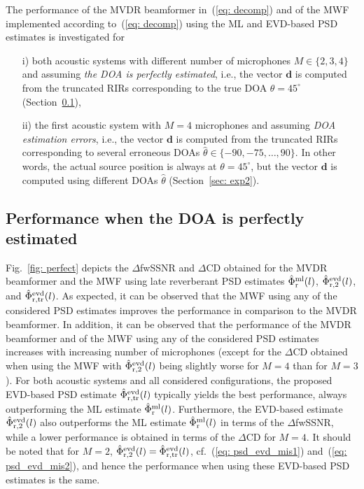 \documentclass{article}
\begin{document}
The performance of the MVDR beamformer in~(\ref{eq: decomp}) and of the MWF implemented according to~(\ref{eq: decomp}) using the ML and EVD-based PSD estimates is investigated for 
\begin{itemize}
\item[i)] both acoustic systems with different number of microphones $M \in \{2, 3, 4 \}$ and assuming {\emph{the DOA is perfectly estimated}}, i.e., the vector $\mathbf{d}$ is computed from the truncated RIRs corresponding to the true DOA $\theta = 45^{\circ}$ (Section~\ref{sec: exp1}), 
\item[ii)] the first acoustic system with $M = 4$ microphones and assuming {\emph{DOA estimation errors}}, i.e., the vector $\mathbf{d}$ is computed from the truncated RIRs corresponding to several erroneous DOAs $\hat{\theta} \in \{-90, -75, \ldots, 90 \}$. 
In other words, the actual source position is always at $\theta = 45^{\circ}$, but the vector $\mathbf{d}$ is computed using different DOAs $\hat{\theta}$ (Section~\ref{sec: exp2}).
\end{itemize}

\subsection{Performance when the DOA is perfectly estimated}
\label{sec: exp1}
Fig.~\ref{fig: perfect} depicts the $\Delta$fwSSNR and $\Delta$CD obtained for the MVDR beamformer and the MWF using late reverberant PSD estimates $\hat{\Phi}^{\rm ml}_{\rm r}(l)$, $\hat{\Phi}^{\rm evd}_{\rm r,2}(l)$, and $\hat{\Phi}^{\rm evd}_{\rm r,tr}(l)$.
As expected, it can be observed that the MWF using any of the considered PSD estimates improves the performance in comparison to the MVDR beamformer.
In addition, it can be observed that the performance of the MVDR beamformer and of the MWF using any of the considered PSD estimates increases with increasing number of microphones (except for the $\Delta$CD obtained when using the MWF with $\hat{\Phi}^{\rm evd}_{\rm r,2}(l)$ being slightly worse for $M = 4$ than for $M = 3$).
For both acoustic systems and all considered configurations, the proposed EVD-based PSD estimate $\hat{\Phi}^{\rm evd}_{\rm r,tr}(l)$ typically yields the best performance, always outperforming the ML estimate $\hat{\Phi}^{\rm ml}_{\rm r}(l)$.
Furthermore, the EVD-based estimate $\hat{\Phi}^{\rm evd}_{\rm r,2}(l)$ also outperforms the ML estimate $\hat{\Phi}^{\rm ml}_{\rm r}(l)$ in terms of the $\Delta$fwSSNR, while a lower performance is obtained in terms of the $\Delta$CD for $M = 4$.
It should be noted that for $M=2$, $\hat{\Phi}^{\rm evd}_{\rm r,2}(l) = \hat{\Phi}^{\rm evd}_{\rm r,tr}(l)$, cf.~(\ref{eq: psd_evd_mis1}) and~(\ref{eq: psd_evd_mis2}), and hence the performance when using these EVD-based PSD estimates is the same.
\end{document}
